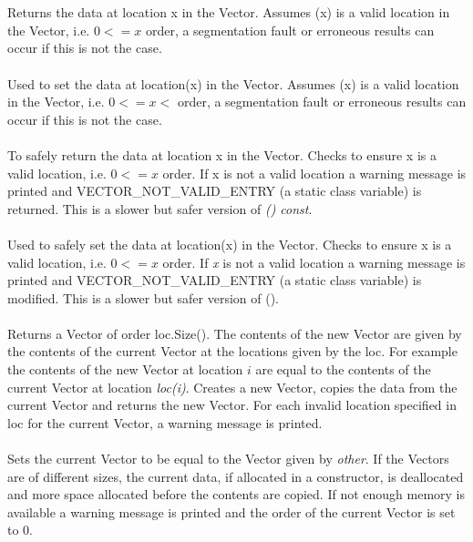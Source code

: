   \\
 \\
Returns the data at location \p x in the Vector. Assumes (\p x) 
is a valid location in the Vector, i.e. $0 <= x $ order, a
segmentation fault or erroneous results can occur if this is not the 
case. \\ 

 \\
Used to set the data at location(\p x) in the Vector. Assumes (\p x)
is a valid location in the Vector, i.e. $0 <= x < $ order, a
segmentation fault or erroneous results can occur if this is not the
case. \\ 

 \\
To safely return the data at location \p x in the Vector. Checks to
ensure \p x is a valid location, i.e. $0 <= x $ order. If \p x
is not a valid location a warning message is printed and
VECTOR\_NOT\_VALID\_ENTRY (a static class variable) is returned. This
is a slower but safer version of {\em () const}.\\ 

 \\
Used to safely set the data at location(\p x) in the Vector. Checks
to ensure \p x is a valid location, i.e. $0 <= x $ order. If {\em
x} is not a valid location a warning message is printed and
VECTOR\_NOT\_VALID\_ENTRY (a static class variable) is modified. This
is a slower but safer version of ().\\ 

\\ 
Returns a Vector of order loc.Size(). The contents of the new
Vector are given by the contents of the current Vector at the
locations given by the \p loc. For example the contents of the new
Vector at location $i$ are equal to the contents of the current Vector
at location {\em loc(i)}. Creates a new Vector, copies the data from
the current Vector and returns the new Vector. For each invalid
location specified in \p loc for the current Vector, a warning
message is printed.\\ 

\\
Sets the current Vector to be equal to the Vector given by {\em
other}. If the Vectors are of different sizes, the current data, if
allocated in a constructor, is deallocated and more space allocated
before the contents are copied. If not enough memory is available a
warning message is printed and the order of the current Vector is set
to $0$.\\ 

